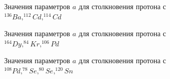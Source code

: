 \documentclass[%
master,    %
natbib,      %
subf,        %
href,        %
colorlinks,  %
]{disser}
\begin{document}
\begin{figure}
	\caption{Значения параметров $a$ для столкновения протона с $^{136}Ba, ^{112}Cd, ^{114}Cd$}
	\label{ris:a-1}
\end{figure}
\begin{figure}
	\caption{Значения параметров $a$ для столкновения протона с $^{164}Dy, ^{84}Kr, ^{106}Pd$}
	\label{ris:a-2}
\end{figure}
\begin{figure}
	\caption{Значения параметров $a$ для столкновения протона с $^{108}Pd, ^{78}Se, ^{80}Se, ^{120}Sn$}
	\label{ris:a-3}
\end{figure}
\end{document}
